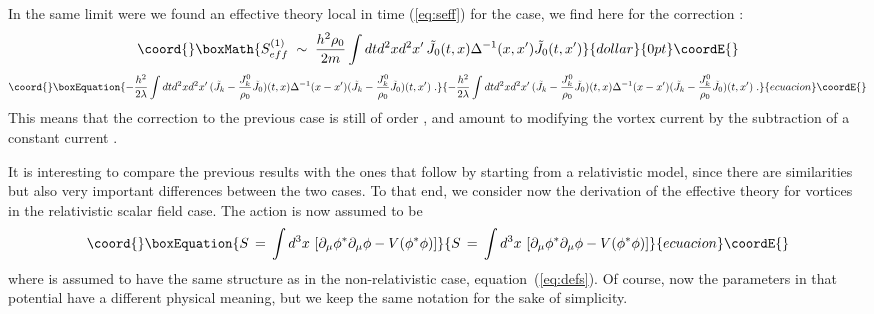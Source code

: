 \documentclass[a4paper,12pt]{article} \tolerance=200
\begin{document}
In the same limit were we found an effective theory local in time
(\ref{eq:seff}) for the \coordHE{} case, we find here for the
correction \coordHE{}:
$$\coord{}\boxMath{
S^{(1)}_{eff} \;\sim\;\frac{h^2\rho_0}{2 m} \int dt d^2x d^2x'\,{\tilde
  J}_0(t,x) \Delta^{-1}(x,x') {\tilde J}_0(t,x')
}{dollar}{0pt}\coordE{}$$
\begin{equation}\coord{}\boxEquation{\label{eq:seffj}
- \frac{h^2}{2 \lambda} \int dt d^2x  d^2x'\, ({\tilde J}_k - \frac{J^0_k}{\rho_0} {\tilde J}_0) (t,x) \Delta^{-1}(x-x')
({\tilde J}_k - \frac{J^0_k}{\rho_0} {\tilde J}_0) (t,x')\;.
}{- \frac{h^2}{2 \lambda} \int dt d^2x  d^2x'\, ({\tilde J}_k - \frac{J^0_k}{\rho_0} {\tilde J}_0) (t,x) \Delta^{-1}(x-x')
({\tilde J}_k - \frac{J^0_k}{\rho_0} {\tilde J}_0) (t,x')\;.
}{ecuacion}\coordE{}\end{equation}
This means that the correction to the previous case is still of order
\coordHE{}, and amount to modifying the vortex current by the
subtraction of a constant current \coordHE{}.


It is interesting to compare the previous results with the ones that
follow by starting from a relativistic model, since there are
similarities but also very important differences between the two
cases. To that end, we consider now the derivation of the effective
theory for vortices in the relativistic scalar field case.  The action
is now assumed to be
\begin{equation}\coord{}\boxEquation{\label{eq:defsr}
S \,=\, \int d^3x \, \left[ \partial_\mu \phi^* \partial_\mu \phi - V(\phi^* \phi) \right]
}{S \,=\, \int d^3x \, \left[ \partial_\mu \phi^* \partial_\mu \phi - V(\phi^* \phi) \right]
}{ecuacion}\coordE{}\end{equation} 
where \coordHE{} is assumed to have the same structure as in the
non-relativistic case, equation~(\ref{eq:defs}). Of course, now the
parameters in that potential have a different physical meaning, but we
keep the same notation for the sake of simplicity.
\end{document}
